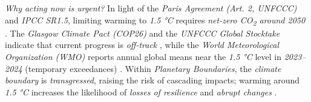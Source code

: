 \emph{Why acting now is urgent?} In light of the \emph{Paris
	Agreement (Art. 2, UNFCCC)} and \emph{IPCC SR1.5}, limiting warming to
\emph{1.5 °C} requires \emph{net-zero CO\textsubscript{2} around 2050} \cite{ipcc2018sr15,unfccc2015paris}.
The \emph{Glasgow Climate Pact (COP26)} and the
\emph{UNFCCC Global Stocktake} indicate that current progress is
\emph{off-track} \cite{unfccc2021glasgow,unfccc2023gst}, while the \emph{World
	Meteorological Organization (WMO)} reports annual global means near the
\emph{1.5 °C} level in \emph{2023--2024} (temporary exceedances)
\cite{wmo2024state,wmo2025press}. Within \emph{Planetary Boundaries}, the
\emph{climate boundary} is \emph{transgressed}, raising the risk of
cascading impacts; warming around \emph{1.5 °C} increases the
likelihood of \emph{losses of resilience} and \emph{abrupt changes}
\cite{richardson2023earth,lenton2019tipping,armstrong2022tipping}.


